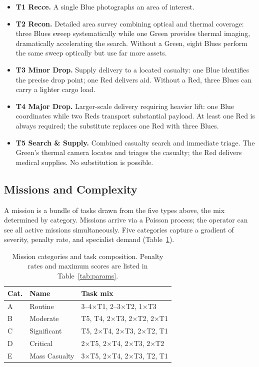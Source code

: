 \documentclass[10pt]{article}
\theoremstyle{definition}
\begin{document}
\begin{itemize}[noitemsep]
  \item \textbf{T1 Recce.} A single Blue photographs an area of interest.
  \item \textbf{T2 Recon.} Detailed area survey combining optical and thermal coverage: three Blues sweep systematically while one Green provides thermal imaging, dramatically accelerating the search. Without a Green, eight Blues perform the same sweep optically but use far more assets.
  \item \textbf{T3 Minor Drop.} Supply delivery to a located casualty: one Blue identifies the precise drop point; one Red delivers aid. Without a Red, three Blues can carry a lighter cargo load.
  \item \textbf{T4 Major Drop.} Larger-scale delivery requiring heavier lift: one Blue coordinates while two Reds transport substantial payload. At least one Red is always required; the substitute replaces one Red with three Blues.
  \item \textbf{T5 Search \& Supply.} Combined casualty search and immediate triage. The Green's thermal camera locates and triages the casualty; the Red delivers medical supplies. No substitution is possible.
\end{itemize}

\subsection{Missions and Complexity}\label{sec:missions}

A mission is a bundle of tasks drawn from the five types above, the mix determined by category. Missions arrive via a Poisson process; the operator can see all active missions simultaneously. Five categories capture a gradient of severity, penalty rate, and specialist demand (Table~\ref{tab:categories}).

\begin{table}[H]
\centering
\caption{Mission categories and task composition. Penalty rates and maximum scores are listed in Table~\ref{tab:params}.}
\label{tab:categories}
\small
\renewcommand{\arraystretch}{1.2}
\begin{tabular}{lll}
\toprule
\textbf{Cat.} & \textbf{Name} & \textbf{Task mix} \\
\midrule
A & Routine       & 3--4$\times$T1, 2--3$\times$T2, 1$\times$T3           \\
B & Moderate      & T5, T4, 2$\times$T3, 2$\times$T2, 2$\times$T1          \\
C & Significant   & T5, 2$\times$T4, 2$\times$T3, 2$\times$T2, T1          \\
D & Critical      & 2$\times$T5, 2$\times$T4, 2$\times$T3, 2$\times$T2     \\
E & Mass Casualty & 3$\times$T5, 2$\times$T4, 2$\times$T3, T2, T1          \\
\bottomrule
\end{tabular}
\end{table}
\end{document}
